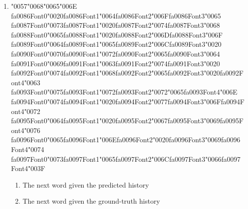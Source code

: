 \documentclass[12pt]{article}
\begin{document}
\begin{enumerate}[label=Q\arabic*.]
\begin{enumerate}[label=(\Alph*)]
    \item A decision tree
\end{enumerate}
\item {\char"0057}{\char"0068}{\char"0065}{\char"006E} {\csname fa0086Font0\endcsname\char"0020}{\csname fa0086Font1\endcsname\char"0064}{\csname fa0086Font2\endcsname\char"006F}{\csname fa0086Font3\endcsname\char"0065} {\csname fa0087Font0\endcsname\char"0073}{\csname fa0087Font1\endcsname\char"0020}{\csname fa0087Font2\endcsname\char"0074}{\csname fa0087Font3\endcsname\char"0068} {\csname fa0088Font0\endcsname\char"0065}{\csname fa0088Font1\endcsname\char"0020}{\csname fa0088Font2\endcsname\char"006D}{\csname fa0088Font3\endcsname\char"006F} {\csname fa0089Font0\endcsname\char"0064}{\csname fa0089Font1\endcsname\char"0065}{\csname fa0089Font2\endcsname\char"006C}{\csname fa0089Font3\endcsname\char"0020} {\csname fa0090Font0\endcsname\char"0070}{\csname fa0090Font1\endcsname\char"0072}{\csname fa0090Font2\endcsname\char"0065}{\csname fa0090Font3\endcsname\char"0064} {\csname fa0091Font0\endcsname\char"0069}{\csname fa0091Font1\endcsname\char"0063}{\csname fa0091Font2\endcsname\char"0074}{\csname fa0091Font3\endcsname\char"0020} {\csname fa0092Font0\endcsname\char"0074}{\csname fa0092Font1\endcsname\char"0068}{\csname fa0092Font2\endcsname\char"0065}{\csname fa0092Font3\endcsname\char"0020}{\csname fa0092Font4\endcsname\char"0063} {\csname fa0093Font0\endcsname\char"0075}{\csname fa0093Font1\endcsname\char"0072}{\csname fa0093Font2\endcsname\char"0072}{\char"0065}{\csname fa0093Font4\endcsname\char"006E} {\csname fa0094Font0\endcsname\char"0074}{\csname fa0094Font1\endcsname\char"0020}{\csname fa0094Font2\endcsname\char"0077}{\csname fa0094Font3\endcsname\char"006F}{\csname fa0094Font4\endcsname\char"0072} {\csname fa0095Font0\endcsname\char"0064}{\csname fa0095Font1\endcsname\char"0020}{\csname fa0095Font2\endcsname\char"0067}{\csname fa0095Font3\endcsname\char"0069}{\csname fa0095Font4\endcsname\char"0076} {\csname fa0096Font0\endcsname\char"0065}{\csname fa0096Font1\endcsname\char"006E}{\csname fa0096Font2\endcsname\char"0020}{\csname fa0096Font3\endcsname\char"0069}{\csname fa0096Font4\endcsname\char"0074} {\csname fa0097Font0\endcsname\char"0073}{\csname fa0097Font1\endcsname\char"0065}{\csname fa0097Font2\endcsname\char"006C}{\csname fa0097Font3\endcsname\char"0066}{\csname fa0097Font4\endcsname\char"003F}
\begin{enumerate}[label=(\Alph*)]
    \item The next word given the predicted history
    \item The next word given the ground-truth history

\end{enumerate}
\end{enumerate}
\end{document}
